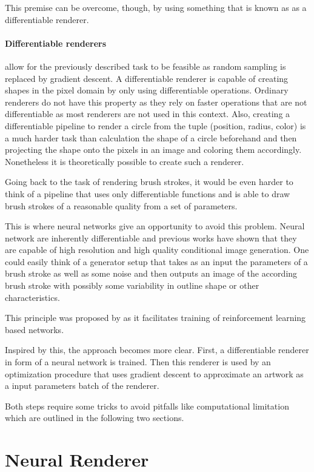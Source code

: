 This premise can be overcome, though, by using something that is known as as a differentiable
renderer.
\paragraph{Differentiable renderers} allow for the previously described task to be
feasible as random sampling is replaced by gradient descent.
A differentiable renderer is capable of creating shapes in the pixel domain by only
using differentiable operations.
Ordinary renderers do not have this property as they rely on faster operations that are
not differentiable as most renderers are not used in this context.
Also, creating a differentiable pipeline to render a circle from the tuple (position,
 radius, color) is a much harder task than calculation the shape of a circle beforehand
and then projecting the shape onto the pixels in an image and coloring them accordingly.
Nonetheless it is theoretically possible to create such a renderer.

Going back to the task of rendering brush strokes, it would be even harder to think
of a pipeline that uses only differentiable functions and is able to draw brush strokes
of a reasonable quality from a set of parameters.

This is where neural networks give an opportunity to avoid this problem.
Neural network are inherently differentiable and previous works have shown that
they are capable of high resolution and high quality conditional image generation.
One could easily think of a generator setup that takes as an input the parameters of
a brush stroke as well as some noise and then outputs an image of the according
brush stroke with possibly some variability in outline shape or other characteristics.

This principle was proposed by \cite{japanese neural renderer} as it facilitates
training of reinforcement learning based networks.

Inspired by this, the approach becomes more clear.
First, a differentiable renderer in form of a neural network is trained.
Then this renderer is used by an optimization procedure that uses gradient descent
to approximate an artwork as a input parameters batch of the renderer.

Both steps require some tricks to avoid pitfalls like computational limitation which
are outlined in the following two sections.

\section{Neural Renderer}


